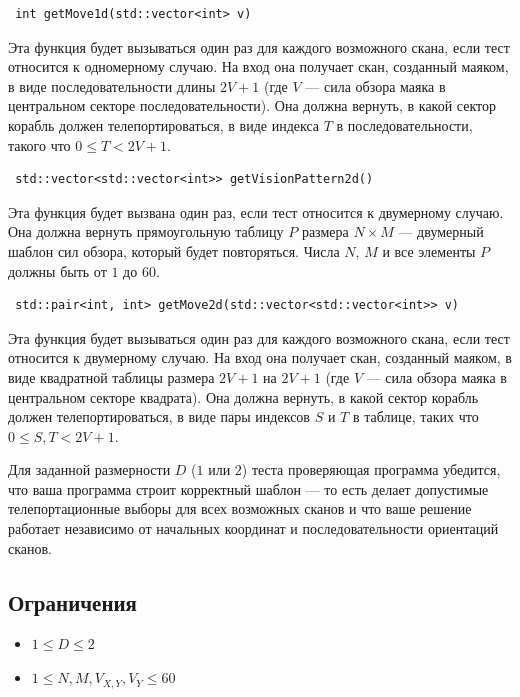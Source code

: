 \documentclass[12pt]{article}
\begin{document}
\begin{lstlisting}
 int getMove1d(std::vector<int> v)
\end{lstlisting}

Эта функция будет вызываться один раз для каждого возможного скана, если тест относится к одномерному случаю. На вход она получает скан, созданный маяком, в виде последовательности длины $2V + 1$ (где $V$ --- сила обзора маяка в центральном секторе последовательности). Она должна вернуть, в какой сектор корабль должен телепортироваться, в виде индекса $T$ в последовательности, такого что $0 \leq T < 2V + 1$.

\begin{lstlisting}
 std::vector<std::vector<int>> getVisionPattern2d()
\end{lstlisting}

Эта функция будет вызвана один раз, если тест относится к двумерному случаю. Она должна вернуть прямоугольную таблицу $P$ размера $N \times M$ --- двумерный шаблон сил обзора, который будет повторяться. Числа $N$, $M$ и все элементы $P$ должны быть от $1$ до $60$.

\begin{lstlisting}
 std::pair<int, int> getMove2d(std::vector<std::vector<int>> v)
\end{lstlisting}

Эта функция будет вызываться один раз для каждого возможного скана, если тест относится к двумерному случаю. На вход она получает скан, созданный маяком, в виде квадратной таблицы размера $2V + 1$ на $2V + 1$ (где $V$ --- сила обзора маяка в центральном секторе квадрата). Она должна вернуть, в какой сектор корабль должен телепортироваться, в виде пары индексов $S$ и $T$ в таблице, таких что $0 \leq S, T < 2V + 1$.

Для заданной размерности $D$ ($1$ или $2$) теста проверяющая программа убедится, что ваша программа строит корректный шаблон --- то есть делает допустимые телепортационные выборы для всех возможных сканов и что ваше решение работает независимо от начальных координат и последовательности ориентаций сканов.

\subsection{Ограничения}

\vspace{0.1em}

\begin{itemize}
\item $1 \leq D \leq 2$
\item $1 \leq N, M, V_{X, Y}, V_Y \leq 60$
\end{itemize}
\end{document}
